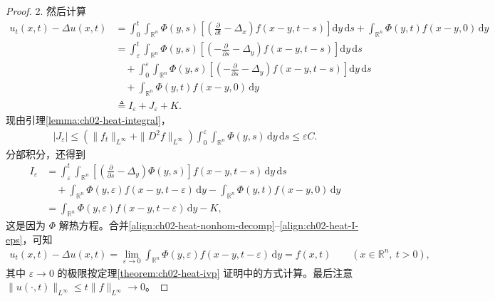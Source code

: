 \documentclass[../../main.tex]{subfiles}
\begin{document}
\begin{proof}
2. 然后计算
\begin{align}\label{align:ch02-heat-nonhom-decomp}
u_t(x,t)-\Delta u(x,t)&=\int_0^t\int_{\mathbb{R}^n}\Phi(y,s)\left[\left(\frac{\partial}{\partial t}-\Delta_x\right)f(x-y,t-s)\right]\mathrm{d}y\,\mathrm{d}s
+\int_{\mathbb{R}^n}\Phi(y,t)f(x-y,0)\,\mathrm{d}y\\
&=\int_\varepsilon^t\int_{\mathbb{R}^n}\Phi(y,s)\left[\left(-\frac{\partial}{\partial s}-\Delta_y\right)f(x-y,t-s)\right]\mathrm{d}y\,\mathrm{d}s\nonumber\\
&\quad+\int_0^\varepsilon\int_{\mathbb{R}^n}\Phi(y,s)\left[\left(-\frac{\partial}{\partial s}-\Delta_y\right)f(x-y,t-s)\right]\mathrm{d}y\,\mathrm{d}s\nonumber\\
&\quad+\int_{\mathbb{R}^n}\Phi(y,t)f(x-y,0)\,\mathrm{d}y\nonumber\\
&\triangleq I_\varepsilon+J_\varepsilon+K.\nonumber
\end{align}
现由引理\cref{lemma:ch02-heat-integral}，
\begin{align}\label{align:ch02-heat-J-eps}
|J_\varepsilon|\leqslant(\|f_t\|_{L^\infty}+\|D^2f\|_{L^\infty})\int_0^\varepsilon\int_{\mathbb{R}^n}\Phi(y,s)\,\mathrm{d}y\,\mathrm{d}s\leqslant\varepsilon C.
\end{align}
分部积分，还得到
\begin{align}\label{align:ch02-heat-I-eps}
I_\varepsilon&=\int_\varepsilon^t\int_{\mathbb{R}^n}\left[\left(\frac{\partial}{\partial s}-\Delta_y\right)\Phi(y,s)\right]f(x-y,t-s)\,\mathrm{d}y\,\mathrm{d}s\\
&\quad+\int_{\mathbb{R}^n}\Phi(y,\varepsilon)f(x-y,t-\varepsilon)\,\mathrm{d}y
-\int_{\mathbb{R}^n}\Phi(y,t)f(x-y,0)\,\mathrm{d}y\nonumber\\
&=\int_{\mathbb{R}^n}\Phi(y,\varepsilon)f(x-y,t-\varepsilon)\,\mathrm{d}y-K,\nonumber
\end{align}
这是因为 $\Phi$ 解热方程。合并\eqref{align:ch02-heat-nonhom-decomp}--\eqref{align:ch02-heat-I-eps}，可知
\begin{align*}
u_t(x,t)-\Delta u(x,t)=\lim_{\varepsilon\to 0}\int_{\mathbb{R}^n}\Phi(y,\varepsilon)f(x-y,t-\varepsilon)\,\mathrm{d}y=f(x,t) \qquad (x\in\mathbb{R}^n,\ t>0),
\end{align*}
其中 $\varepsilon\to 0$ 的极限按定理\cref{theorem:ch02-heat-ivp} 证明中的方式计算。最后注意 $\|u(\cdot,t)\|_{L^\infty}\leqslant t\|f\|_{L^\infty}\to 0$。
\end{proof}
\end{document}
